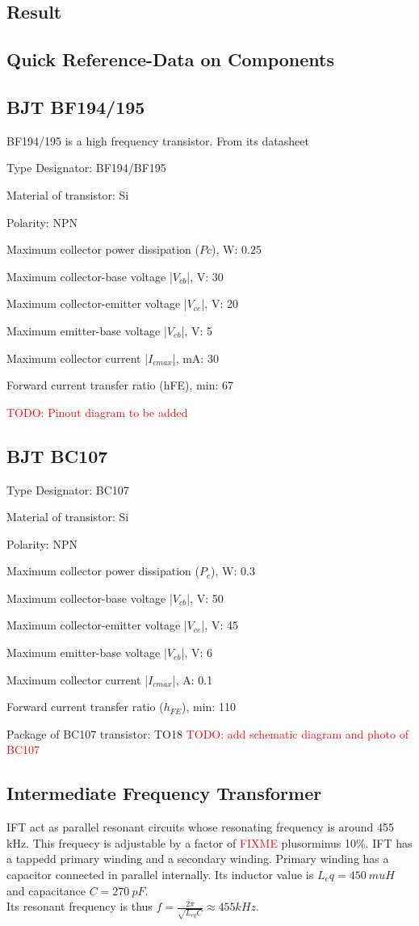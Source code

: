 \documentclass{book}
\begin{document}
\section*{Result}
\begin{appendix}
\chapter {Quick Reference-Data on Components}
\section{BJT BF194/195}
\label{BF194/195}
BF194/195 is a high frequency transistor. From its datasheet 

Type Designator: BF194/BF195

Material of transistor: Si

Polarity: NPN

Maximum collector power dissipation ($Pc$), W: 0.25

Maximum collector-base voltage |$V_{cb}$|, V: 30

Maximum collector-emitter voltage |$V_{ce}$|, V: 20

Maximum emitter-base voltage |$V_{eb}$|, V: 5

Maximum collector current |$I_{c max}$|, mA: 30

Forward current transfer ratio (hFE), min: 67

\textcolor{red}{TODO: Pinout diagram to be added}
\section{BJT BC107}
\label{BC107}
Type Designator: BC107

Material of transistor: Si

Polarity: NPN

Maximum collector power dissipation ($P_c$), W: 0.3

Maximum collector-base voltage |$V_{cb}$|, V: 50

Maximum collector-emitter voltage |$V_{ce}$|, V: 45

Maximum emitter-base voltage |$V_{eb}$|, V: 6

Maximum collector current |$I_{cmax}$|, A: 0.1

Forward current transfer ratio ($h_{FE}$), min: 110

Package of BC107 transistor: TO18
\textcolor{red}{TODO: add schematic diagram and photo of BC107}

\section{Intermediate Frequency Transformer}
\label{IFT}
IFT act as parallel resonant circuits whose resonating frequency is around 455 kHz. This frequecy is adjustable by a factor of  \textcolor{red}{FIXME} plusorminus 10\%. IFT has a tappedd primary winding and a secondary winding. Primary winding has a capacitor connected in parallel internally. Its inductor value is $L_eq=450\ mu H$ and capacitance $C=270\ pF$. 
\\Its resonant frequency is thus $f=\frac{2\pi}{\sqrt{L_{eq}C}}\approx 455 kHz$.


\end{appendix}
\end{document}
